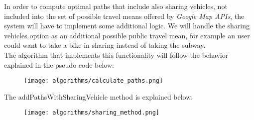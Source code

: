 In order to compute optimal paths that include also sharing vehicles, not included into the set of possible travel means offered by \textit{Google Map APIs}, the system will have to implement some additional logic. We will handle the sharing vehicles option as an additional possible public travel mean, for example an user could want to take a bike in sharing instead of taking the subway.\\
The algorithm that implements this functionality will follow the behavior explained in the pseudo-code below:
\begin{figure}[H]
\begin{center}
		\texttt{[image: algorithms/calculate\_paths.png]}
\end{center}
\end{figure}
\noindent The addPathsWithSharingVehicle method is explained below:
\begin{figure}[H]
\begin{center}
		\texttt{[image: algorithms/sharing\_method.png]}
		
\end{center}
\end{figure}

